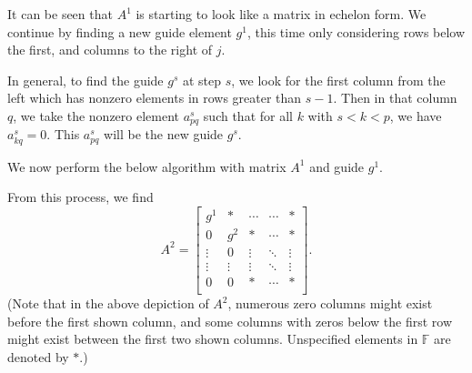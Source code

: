 \documentclass[12pt]{article}
\newcommand{\F}{\mathbb{F}}
\begin{document}
It can be seen that $A^1$ is starting to look like a matrix in echelon form. We continue by finding a new guide element $g^1$, this time only considering rows below the first, and columns to the right of $j$. 

In general, to find the guide $g^s$ at step $s$, we look for the first column from the left which has nonzero elements in rows greater than $s-1$. Then in that column $q$, we take the nonzero element $a^s_{pq}$ such that for all $k$ with $s<k<p$, we have $a^s_{kq}=0$. This $a^s_{pq}$ will be the new guide $g^s$.

We now perform the below algorithm with matrix $A^1$ and guide $g^1$.

\vspace{1em}
\noindent
{}\vspace{1em}

From this process, we find
\[A^2 =
    \begin{bmatrix}
        g^1    & *      & \cdots & \cdots & * \\
        0      & g^2    & *      & \cdots & *   \\
        \vdots & 0      & \vdots & \ddots & \vdots   \\
        \vdots & \vdots & \vdots & \ddots & \vdots   \\
        0      & 0      & *      & \cdots & * \\
    \end{bmatrix}
.\]
(Note that in the above depiction of $A^2$, numerous zero columns might exist before the first shown column, and some columns with zeros below the first row might exist between the first two shown columns. Unspecified elements in $\F$ are denoted by $*$.)
\end{document}
